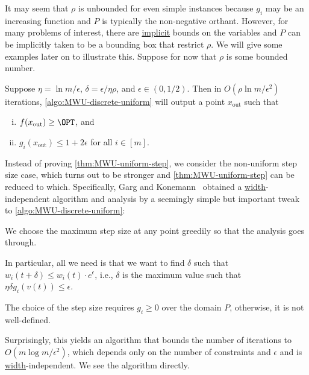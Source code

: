 It may seem that \(\rho \) is unbounded for even simple instances because \(g_i\) may be an increasing function and \(P\) is typically the non-negative orthant. However, for many problems of interest, there are \hyperref[def:implicit-LP]{implicit} bounds on the variables and \(P\) can be implicitly taken to be a bounding box that restrict \(\rho \). We will give some examples later on to illustrate this. Suppose for now that \(\rho \) is some bounded number.

\begin{theorem}\label{thm:MWU-uniform-step}
	Suppose \(\eta = \ln m / \epsilon \), \(\delta = \epsilon / \eta \rho \), and \(\epsilon \in (0, 1 / 2)\). Then in \(O(\rho \ln m / \epsilon ^2)\) iterations, \autoref{algo:MWU-discrete-uniform} will output a point \(x_{\text{out} }\) such that
	\begin{enumerate}[(i)]
		\item \(f(x_{\text{out} }) \geq \OPT\), and
		\item \(g_i(x_{\text{out} }) \leq 1 + 2\epsilon \) for all \(i \in [m]\).
	\end{enumerate}
\end{theorem}

Instead of proving \autoref{thm:MWU-uniform-step}, we consider the non-uniform step size case, which turns out to be stronger and \autoref{thm:MWU-uniform-step} can be reduced to which. Specifically, Garg and Konemann~\cite{garg2007faster} obtained a \hyperref[def:width]{width}-independent algorithm and analysis by a seemingly simple but important tweak to \autoref{algo:MWU-discrete-uniform}:

\begin{intuition}
	We choose the maximum step size at any point greedily so that the analysis goes through.
\end{intuition}

In particular, all we need is that we want to find \(\delta \) such that \(w_i(t + \delta ) \leq w_i(t) \cdot e^{\epsilon } \), i.e., \(\delta \) is the maximum value such that \(\eta \delta g_i(v(t)) \leq \epsilon \).

\begin{note}
	The choice of the step size requires \(g_i \geq 0\) over the domain \(P\), otherwise, it is not well-defined.
\end{note}

Surprisingly, this yields an algorithm that bounds the number of iterations to \(O(m \log m / \epsilon ^2)\), which depends only on the number of constraints and \(\epsilon \) and is \hyperref[def:width]{width}-independent. We see the algorithm directly.

